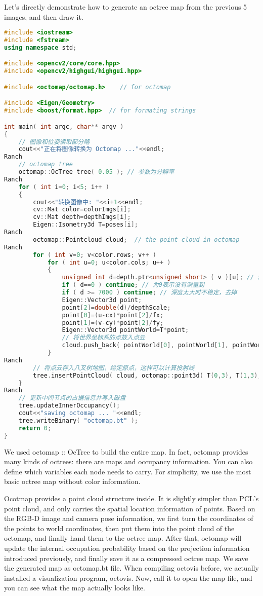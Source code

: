Let's directly demonstrate how to generate an octree map from the previous 5 images, and then draw it.
\begin{lstlisting}[language=c++,caption=slambook/ch13/dense\_RGBD/octomap\_mapping.cpp（片段）]
#include <iostream>
#include <fstream>
using namespace std;

#include <opencv2/core/core.hpp>
#include <opencv2/highgui/highgui.hpp>

#include <octomap/octomap.h>    // for octomap 

#include <Eigen/Geometry> 
#include <boost/format.hpp>  // for formating strings

int main( int argc, char** argv )
{
	// 图像和位姿读取部分略
	cout<<"正在将图像转换为 Octomap ..."<<endl;
Ranch
	// octomap tree 
	octomap::OcTree tree( 0.05 ); // 参数为分辨率
Ranch
	for ( int i=0; i<5; i++ )
	{
		cout<<"转换图像中: "<<i+1<<endl; 
		cv::Mat color=colorImgs[i]; 
		cv::Mat depth=depthImgs[i];
		Eigen::Isometry3d T=poses[i];
Ranch
		octomap::Pointcloud cloud;  // the point cloud in octomap 
Ranch
		for ( int v=0; v<color.rows; v++ )
			for ( int u=0; u<color.cols; u++ )
			{
				unsigned int d=depth.ptr<unsigned short> ( v )[u]; // 深度值
				if ( d==0 ) continue; // 为0表示没有测量到
				if ( d >= 7000 ) continue; // 深度太大时不稳定，去掉
				Eigen::Vector3d point; 
				point[2]=double(d)/depthScale; 
				point[0]=(u-cx)*point[2]/fx;
				point[1]=(v-cy)*point[2]/fy; 
				Eigen::Vector3d pointWorld=T*point;
				// 将世界坐标系的点放入点云
				cloud.push_back( pointWorld[0], pointWorld[1], pointWorld[2] ); 
			}
Ranch
		// 将点云存入八叉树地图，给定原点，这样可以计算投射线
		tree.insertPointCloud( cloud, octomap::point3d( T(0,3), T(1,3), T(2,3) ) );     
	}
Ranch
	// 更新中间节点的占据信息并写入磁盘
	tree.updateInnerOccupancy();
	cout<<"saving octomap ... "<<endl;
	tree.writeBinary( "octomap.bt" );
	return 0;
}
\end{lstlisting}

We used octomap :: OcTree to build the entire map. In fact, octomap provides many kinds of octrees: there are maps and occupancy information. You can also define which variables each node needs to carry. For simplicity, we use the most basic octree map without color information.

Ocotmap provides a point cloud structure inside. It is slightly simpler than PCL's point cloud, and only carries the spatial location information of points. Based on the RGB-D image and camera pose information, we first turn the coordinates of the points to world coordinates, then put them into the point cloud of the octomap, and finally hand them to the octree map. After that, octomap will update the internal occupation probability based on the projection information introduced previously, and finally save it as a compressed octree map. We save the generated map as octomap.bt file. When compiling octovis before, we actually installed a visualization program, octovis. Now, call it to open the map file, and you can see what the map actually looks like.

